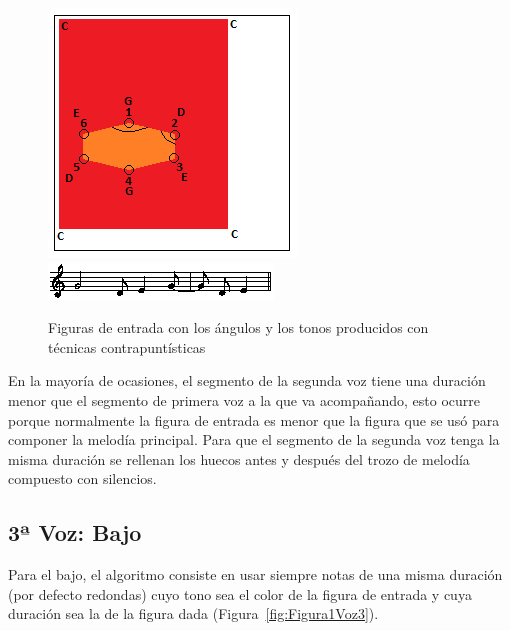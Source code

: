 		\begin{figure}[htbp]
		\centering
		\hspace*{0.0in}
		\includegraphics[scale=1]{graphics/simpletest4-F3_2.png}
		\includegraphics[scale=1]{graphics/simpletest4-F3_2-MEL2partitura.png}
		\caption{Figuras de entrada con los ángulos y los tonos producidos con técnicas contrapuntísticas}
		\label{fig:Figura4Voz2}
		\end{figure}

En la mayoría de ocasiones, el segmento de la segunda voz tiene una duración menor que el segmento de primera voz a la que va acompañando, esto ocurre porque normalmente la figura de entrada es menor que la figura que se usó para componer la melodía principal. Para que el segmento de la segunda voz tenga la misma duración se rellenan los huecos antes y después del trozo de melodía compuesto con silencios.


\subsection{3ª Voz: Bajo}

Para el bajo, el algoritmo consiste en usar siempre notas de una misma duración (por defecto redondas) cuyo tono sea el color de la figura de entrada y cuya duración sea la de la figura dada (Figura~\ref{fig:Figura1Voz3}).

